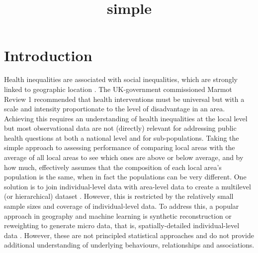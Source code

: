 \documentclass[12pt]{article}
\title{simple}
\date{}
\begin{document}
	\maketitle 

\section*{Introduction}

Health inequalities are associated with social inequalities, which are strongly linked to geographic location \cite{TheMarmotReview2010}. The UK-government commissioned Marmot Review 1 recommended that health interventions must be universal but with a scale and intensity proportionate to the level of disadvantage in an area. Achieving this requires an understanding of health inequalities at the local level but most observational data are not (directly) relevant for addressing public health questions at both a national level and for sub-populations. Taking the simple approach to assessing performance of comparing local areas with the average of all local areas to see which ones are above or below average, and by how much, effectively assumes that the composition of each local area’s population is the same, when in fact the populations can be very different.
One solution is to join individual-level data with area-level data to create a multilevel (or hierarchical) dataset \cite{Waroux2014}. However, this is restricted by the relatively small sample sizes and coverage of individual-level data. To address this, a popular approach in geography and machine learning is synthetic reconstruction or reweighting to generate micro data, that is, spatially-detailed individual-level data \cite{Rahman2008}. However, these are not principled statistical approaches and do not provide additional understanding of underlying behaviours, relationships and associations.
\end{document}
